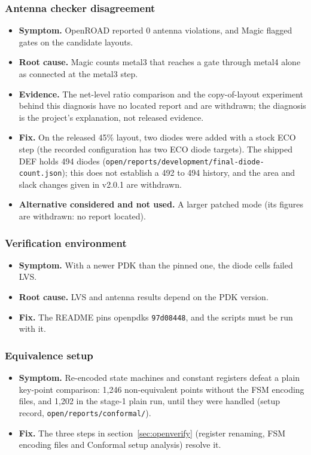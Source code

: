 \documentclass[11pt,letterpaper]{article}
\newcommand{\sk}[1]{\texttt{#1}}
\renewcommand{\_}{\textunderscore\penalty0\hskip0pt\relax}
\begin{document}
\subsubsection*{Antenna checker disagreement}
\begin{itemize}
\item \textbf{Symptom.} OpenROAD reported 0 antenna violations, and Magic flagged gates on the candidate layouts.
\item \textbf{Root cause.} Magic counts metal3 that reaches a gate through metal4 alone as connected at the metal3 step.
\item \textbf{Evidence.} The net-level ratio comparison and the copy-of-layout experiment behind this diagnosis have no located report and are withdrawn; the diagnosis is the project's explanation, not released evidence.
\item \textbf{Fix.} On the released 45\% layout, two diodes were added with a stock ECO step (the recorded configuration has two ECO diode targets). The shipped DEF holds 494 diodes (\sk{open/reports/development/final-diode-count.json}); this does not establish a 492 to 494 history, and the area and slack changes given in v2.0.1 are withdrawn.
\item \textbf{Alternative considered and not used.} A larger patched mode (its figures are withdrawn: no report located).
\end{itemize}

\subsubsection*{Verification environment}
\begin{itemize}
\item \textbf{Symptom.} With a newer PDK than the pinned one, the diode cells failed LVS.
\item \textbf{Root cause.} LVS and antenna results depend on the PDK version.
\item \textbf{Fix.} The README pins open\_pdks \sk{97d08448}, and the scripts must be run with it.
\end{itemize}

\subsubsection*{Equivalence setup}
\begin{itemize}
\item \textbf{Symptom.} Re-encoded state machines and constant registers defeat a plain key-point comparison: 1,246 non-equivalent points without the FSM encoding files, and 1,202 in the stage-1 plain run, until they were handled (setup record, \sk{open/reports/conformal/}).
\item \textbf{Fix.} The three steps in section~\ref{sec:openverify} (register renaming, FSM encoding files and Conformal setup analysis) resolve it.
\end{itemize}
\end{document}
